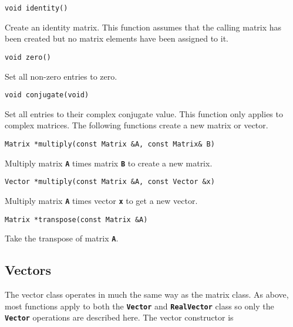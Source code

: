 {
\color{red}
\begin{Verbatim}[fontseries=b]
void identity()
\end{Verbatim}
}

Create an identity matrix. This function assumes that the calling matrix has been created but no matrix elements have been assigned to it.

{
\color{red}
\begin{Verbatim}[fontseries=b]
void zero()
\end{Verbatim}
}

Set all non-zero entries to zero.

{
\color{red}
\begin{Verbatim}[fontseries=b]
void conjugate(void)
\end{Verbatim}
}

Set all entries to their complex conjugate value. This function only applies to complex matrices.
The following functions create a new matrix or vector.

{
\color{red}
\begin{Verbatim}[fontseries=b]
Matrix *multiply(const Matrix &A, const Matrix& B)
\end{Verbatim}
}

Multiply matrix \texttt{\textbf{A}} times matrix \texttt{\textbf{B}} to create a new matrix.

{
\color{red}
\begin{Verbatim}[fontseries=b]
Vector *multiply(const Matrix &A, const Vector &x)
\end{Verbatim}
}

Multiply matrix \texttt{\textbf{A}} times vector \texttt{\textbf{x}} to get a new vector.

{
\color{red}
\begin{Verbatim}[fontseries=b]
Matrix *transpose(const Matrix &A)
\end{Verbatim}
}

Take the transpose of matrix \texttt{\textbf{A}}.

\subsection{Vectors}\label{vectors}

The vector class operates in much the same way as the matrix class. As above, most functions apply to both the \texttt{\textbf{Vector}} and \texttt{\textbf{RealVector}} class so only the \texttt{\textbf{Vector}} operations are described here. The vector constructor is


